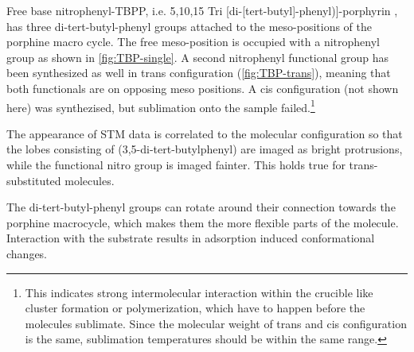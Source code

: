 Free base nitrophenyl-TBPP, i.e. 5,10,15 Tri [di-[tert-butyl]-phenyl)]-porphyrin , has three di-tert-butyl-phenyl groups attached to the meso-positions of the porphine macro cycle. The free meso-position is occupied with a nitrophenyl group as shown in \autoref{fig:TBP-single}. A second nitrophenyl functional group has been synthesized as well in trans configuration (\autoref{fig:TBP-trans}), meaning that both functionals are on opposing meso positions. A cis configuration (not shown here) was synthezised, but sublimation onto the sample failed.\footnote{This indicates strong intermolecular interaction within the crucible like cluster formation or polymerization, which have to happen before the molecules sublimate. Since the molecular weight of trans and cis configuration is the same, sublimation temperatures should be within the same range.}

The appearance of STM data is correlated to the molecular configuration so that the lobes consisting of (3,5-di-tert-butylphenyl) are imaged as bright protrusions, while the functional nitro group is imaged fainter.\cite{mishra_current-driven_2015} This holds true for trans-substituted molecules\cite{yokoyama_selective_2001}.

The di-tert-butyl-phenyl groups can rotate around their connection towards the porphine macrocycle, which makes them the more flexible parts of the molecule. Interaction with the substrate results in adsorption induced conformational changes.\cite{ecija_dynamics_2016}

